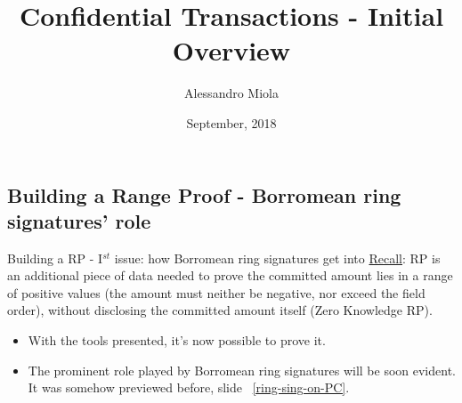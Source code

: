 \documentclass[10.5pt,compress]{beamer}
\title[Confidential Transactions - Initial Overview]{Confidential Transactions - Initial Overview}
\author[Alessandro Miola]{
Alessandro Miola}
\institute[] %
{}
\date[September 2018]{September, 2018}
\begin{document}
\renewcommand*{\inserttotalframenumber}{\pageref{lastframe}}

\begin{frame}
  \titlepage
\end{frame}



\subsection{Building a Range Proof - Borromean ring signatures' role}
\begin{frame}{Building a RP - I$^{st}$ issue: how Borromean ring signatures get into}
    \underline{Recall}: RP is an additional piece of data needed to prove the committed amount lies in a range of positive values (the amount must neither be negative, nor exceed the field order), without disclosing the committed amount itself (Zero Knowledge RP).
    \begin{itemize}
        \item With the tools presented, it's now possible to prove it.
        \item The prominent role played by Borromean ring signatures will be soon evident. It was somehow previewed before, slide ~\ref{ring-sing-on-PC}.
    \end{itemize}
\end{frame}
\end{document}
